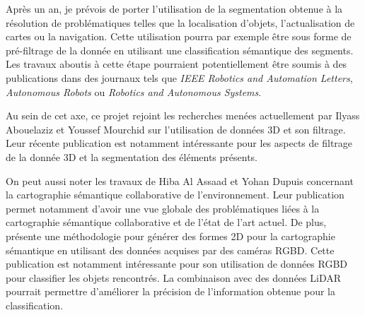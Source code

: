 \documentclass[a4paper, french, 10pt, onecolumn, notitlepage, roman]{article}
\begin{document}
Après un an, je prévois de porter l'utilisation de la segmentation obtenue à la résolution de problématiques telles que la localisation d'objets, l'actualisation de cartes ou la navigation.
Cette utilisation pourra par exemple être sous forme de pré-filtrage de la donnée en utilisant une classification sémantique des segments.
Les travaux aboutis à cette étape pourraient potentiellement être soumis à des publications dans des journaux tels que \emph{IEEE Robotics and Automation Letters}, \emph{Autonomous Robots} ou \emph{Robotics and Autonomous Systems}.

Au sein de cet axe, ce projet rejoint les recherches menées actuellement par Ilyass Abouelaziz et Youssef Mourchid sur l'utilisation de données 3D et son filtrage.
Leur récente publication \cite{abouelaziz:arxiv:2024} est notamment intéressante pour les aspects de filtrage de la donnée 3D et la segmentation des éléments présents.

On peut aussi noter les travaux de Hiba Al Assaad et Yohan Dupuis concernant la cartographie sémantique collaborative de l'environnement.
Leur publication \cite{achour:as:2022} permet notamment d'avoir une vue globale des problématiques liées à la cartographie sémantique collaborative et de l'état de l'art actuel.
De plus, \cite{achour:gretsi:2023} présente une méthodologie pour générer des formes 2D pour la cartographie sémantique en utilisant des données acquises par des caméras RGBD.
Cette publication est notamment intéressante pour son utilisation de données RGBD pour classifier les objets rencontrés.
La combinaison avec des données LiDAR pourrait permettre d'améliorer la précision de l'information obtenue pour la classification.

\vspace{0.5cm}

\newpage
\printbibliography

\end{document}
